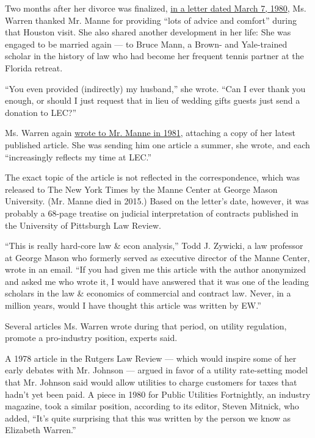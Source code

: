 Two months after her divorce was finalized,
\href{https://int.graylady3jvrrxbe.onion/data/documenthelper/1648-warren-to-manne-3-7-1980-1-1/a741af593ce52226ffe3/optimized/full.pdf\#page=1}{in
a letter dated March 7, 1980}, Ms. Warren thanked Mr. Manne for
providing ``lots of advice and comfort'' during that Houston visit. She
also shared another development in her life: She was engaged to be
married again --- to Bruce Mann, a Brown- and Yale-trained scholar in
the history of law who had become her frequent tennis partner at the
Florida retreat.

``You even provided (indirectly) my husband,'' she wrote. ``Can I ever
thank you enough, or should I just request that in lieu of wedding gifts
guests just send a donation to LEC?''

Ms. Warren again
\href{https://int.graylady3jvrrxbe.onion/data/documenthelper/1650-gmu-00006434-pdf/a741af593ce52226ffe3/optimized/full.pdf\#page=2}{wrote
to Mr. Manne in 1981}, attaching a copy of her latest published article.
She was sending him one article a summer, she wrote, and each
``increasingly reflects my time at LEC.''

The exact topic of the article is not reflected in the correspondence,
which was released to The New York Times by the Manne Center at George
Mason University. (Mr. Manne died in 2015.) Based on the letter's date,
however, it was probably a 68-page treatise on judicial interpretation
of contracts published in the University of Pittsburgh Law Review.

``This is really hard-core law \& econ analysis,'' Todd J. Zywicki, a
law professor at George Mason who formerly served as executive director
of the Manne Center, wrote in an email. ``If you had given me this
article with the author anonymized and asked me who wrote it, I would
have answered that it was one of the leading scholars in the law \&
economics of commercial and contract law. Never, in a million years,
would I have thought this article was written by EW.''

Several articles Ms. Warren wrote during that period, on utility
regulation, promote a pro-industry position, experts said.

A 1978 article in the Rutgers Law Review --- which would inspire some of
her early debates with Mr. Johnson --- argued in favor of a utility
rate-setting model that Mr. Johnson said would allow utilities to charge
customers for taxes that hadn't yet been paid. A piece in 1980 for
Public Utilities Fortnightly, an industry magazine, took a similar
position, according to its editor, Steven Mitnick, who added, ``It's
quite surprising that this was written by the person we know as
Elizabeth Warren.''

